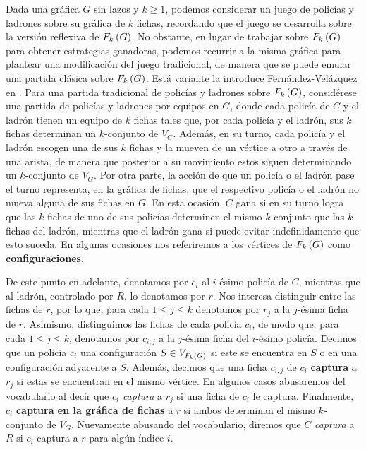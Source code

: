 Dada una gr\'afica $G$ sin lazos y $k\ge 1$, podemos considerar un juego de
polic\'ias y ladrones sobre su gr\'afica de $k$ fichas, recordando que el juego
se desarrolla sobre la versi\'on reflexiva de $F_{k}\left( G\right)$. No obstante, en lugar
de trabajar sobre $F_{k}\left( G\right)$ para obtener estrategias ganadoras, podemos
recurrir a la misma gr\'afica para plantear una modificaci\'on del juego
tradicional, de manera que se puede emular una partida cl\'asica sobre
$F_{k}\left( G\right)$. Est\'a variante la introduce Fern\'andez-Vel\'azquez en
\cite{fernandez}. Para una partida tradicional de polic\'ias y ladrones sobre
$F_{k}\left( G\right)$, consid\'erese una partida de polic\'ias y ladrones por equipos en
$G$, donde cada polic\'ia de $C$ y el ladr\'on tienen un equipo de $k$ fichas
tales que, por cada polic\'ia y el ladr\'on, sus $k$ fichas determinan un
$k$-conjunto de $V_G$. Adem\'as, en su turno, cada polic\'ia y el ladr\'on
escogen una de sus $k$ fichas y la mueven de un v\'ertice a otro a trav\'es de
una arista, de manera que posterior a su movimiento estos siguen determinando un
$k$-conjunto de $V_G$. Por otra parte, la acci\'on de que un polic\'ia o el
ladr\'on pase el turno representa, en la gr\'afica de fichas, que el respectivo
polic\'ia o el ladr\'on no mueva alguna de sus fichas en $G$. En esta ocasi\'on,
$C$ gana si en su turno logra que las $k$ fichas de uno de sus polic\'ias
determinen el mismo $k$-conjunto que las $k$ fichas del ladr\'on, mientras que
el ladr\'on gana si puede evitar indefinidamente que esto suceda. En algunas
ocasiones nos referiremos a los v\'ertices de $F_{k}\left( G\right)$ como
\textbf{configuraciones}.

De este punto en adelante, denotamos por $c_i$ al $i$-\'esimo polic\'ia de $C$,
mientras que al ladr\'on, controlado por $R$, lo denotamos por $r$. Nos interesa
distinguir entre las fichas de $r$, por lo que, para cada $1\leq j\leq k$
denotamos por $r_j$ a la $j$-\'esima ficha de $r$. Asimismo, distinguimos las
fichas de cada polic\'ia $c_i$, de modo que, para cada $1\leq j\leq k$,
denotamos por $c_{i,j}$ a la $j$-\'esima ficha del $i$-\'esimo polic\'ia.
Decimos que un polic\'ia $c_i$  una configuraci\'on $S\in
V_{F_{k}\left( G\right)}$ si este se encuentra en $S$ o en una configuraci\'on adyacente a
$S$. Adem\'as, decimos que una ficha $c_{i,j}$ de $c_i$
\textbf{captura} a $r_j$ si estas se encuentran en el
mismo v\'ertice. En algunos casos abusaremos del vocabulario al decir que $c_i$
\textit{captura} a $r_j$ si una ficha de $c_i$ le captura. Finalmente, $c_i$
\textbf{captura en la gr\'afica de fichas} a $r$ si ambos determinan el mismo $k$-conjunto de $V_{G}$. Nuevamente
abusando del vocabulario, diremos que $C$ \textit{captura} a $R$ si $c_i$
captura a $r$ para alg\'un \'indice $i$.